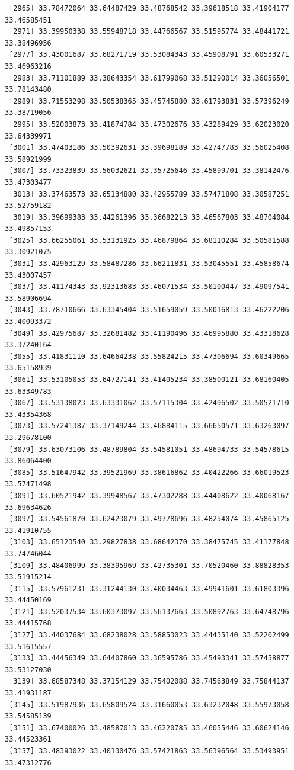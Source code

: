 \documentclass[
  letterpaper,
  DIV=11,
  numbers=noendperiod]{scrartcl}
\begin{document}
\begin{verbatim}
 [2965] 33.78472064 33.64487429 33.48768542 33.39618518 33.41904177 33.46585451
 [2971] 33.39950338 33.55948718 33.44766567 33.51595774 33.48441721 33.38496956
 [2977] 33.43001687 33.68271719 33.53084343 33.45908791 33.60533271 33.46963216
 [2983] 33.71101889 33.38643354 33.61799068 33.51290014 33.36056501 33.78143480
 [2989] 33.71553298 33.50538365 33.45745880 33.61793831 33.57396249 33.38719056
 [2995] 33.52003873 33.41874784 33.47302676 33.43289429 33.62023020 33.64339971
 [3001] 33.47403186 33.50392631 33.39698189 33.42747783 33.56025408 33.58921999
 [3007] 33.73323839 33.56032621 33.35725646 33.45899701 33.38142476 33.47303477
 [3013] 33.37463573 33.65134880 33.42955789 33.57471808 33.30587251 33.52759182
 [3019] 33.39699383 33.44261396 33.36682213 33.46567803 33.48704084 33.49857153
 [3025] 33.66255061 33.53131925 33.46879864 33.68110284 33.50581588 33.30921075
 [3031] 33.42963129 33.58487286 33.66211831 33.53045551 33.45858674 33.43007457
 [3037] 33.41174343 33.92313683 33.46071534 33.50100447 33.49097541 33.58906694
 [3043] 33.78710666 33.63345404 33.51659059 33.50016813 33.46222206 33.40093372
 [3049] 33.42975687 33.32681482 33.41190496 33.46995880 33.43318628 33.37240164
 [3055] 33.41831110 33.64664238 33.55824215 33.47306694 33.60349665 33.65158939
 [3061] 33.53105053 33.64727141 33.41405234 33.38500121 33.68160405 33.63349783
 [3067] 33.53138023 33.63331062 33.57115304 33.42496502 33.50521710 33.43354368
 [3073] 33.57241387 33.37149244 33.46884115 33.66650571 33.63263097 33.29678100
 [3079] 33.63073106 33.48789804 33.54581051 33.48694733 33.54578615 33.86064400
 [3085] 33.51647942 33.39521969 33.38616862 33.40422266 33.66019523 33.57471498
 [3091] 33.60521942 33.39948567 33.47302288 33.44408622 33.40068167 33.69634626
 [3097] 33.54561870 33.62423079 33.49778696 33.48254074 33.45865125 33.41910755
 [3103] 33.65123540 33.29827838 33.68642370 33.38475745 33.41177848 33.74746044
 [3109] 33.48406999 33.38395969 33.42735301 33.70520460 33.88828353 33.51915214
 [3115] 33.57961231 33.31244130 33.40034463 33.49941601 33.61803396 33.44450169
 [3121] 33.52037534 33.60373097 33.56137663 33.50892763 33.64748796 33.44415768
 [3127] 33.44037684 33.68238028 33.58853023 33.44435140 33.52202499 33.51615557
 [3133] 33.44456349 33.64407860 33.36595786 33.45493341 33.57458877 33.53127030
 [3139] 33.68587348 33.37154129 33.75402088 33.74563849 33.75844137 33.41931187
 [3145] 33.51987936 33.65809524 33.31660053 33.63232048 33.55973058 33.54585139
 [3151] 33.67400026 33.48587013 33.46220785 33.46055446 33.60624146 33.44523361
 [3157] 33.48393022 33.40130476 33.57421863 33.56396564 33.53493951 33.47312776

\end{verbatim}
\end{document}
